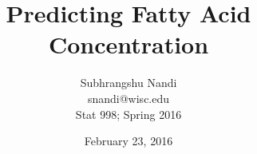 \documentclass[12pt]{article}
\begin{document}
\title{Predicting Fatty Acid Concentration}

\author{Subhrangshu Nandi \\
	snandi@wisc.edu \\	
	Stat 998; Spring 2016}
\date{February 23, 2016}

\maketitle









\newpage
\begin{appendix}

\end{appendix}
\end{document}
